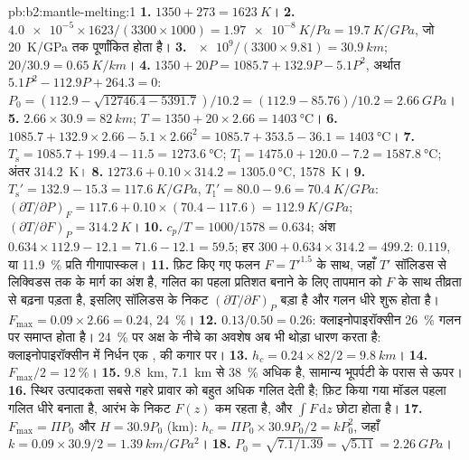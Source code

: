 \begin{solution}{pb:b2:mantle-melting:1}
\textbf{1.} $1350 + 273 = \qty{1623}{K}$।
\textbf{2.} $\num{4.0e-5}\times1623/(3300\times1000) = \qty{1.97e-8}{K/Pa} =
\qty{19.7}{K/GPa}$, जो \qty{20}{K/GPa} तक पूर्णांकित होता है।
\textbf{3.} $\num{e9}/(3300\times9.81) = \qty{30.9}{km}$; $20/30.9 =
\qty{0.65}{K/km}$।
\textbf{4.} $1350 + 20P = 1085.7 + 132.9P - 5.1P^2$, अर्थात $5.1P^2 - 112.9P +
264.3 = 0$: $P_0 = (112.9 - \sqrt{12746.4 - 5391.7})/10.2 = (112.9 - 85.76)/10.2 =
\qty{2.66}{GPa}$।
\textbf{5.} $2.66\times30.9 = \qty{82}{km}$; $T = 1350 + 20\times2.66 =
\qty{1403}{\celsius}$।
\textbf{6.} $1085.7 + 132.9\times2.66 - 5.1\times2.66^2 = 1085.7 + 353.5 - 36.1 =
\qty{1403}{\celsius}$।
\textbf{7.} $T_{\mathrm s} = 1085.7 + 199.4 - 11.5 = \qty{1273.6}{\celsius}$;
$T_{\mathrm l} = 1475.0 + 120.0 - 7.2 = \qty{1587.8}{\celsius}$; अंतर
\qty{314.2}{K}।
\textbf{8.} $1273.6 + 0.10\times314.2 = \qty{1305.0}{\celsius}$, \qty{1578}{K}।
\textbf{9.} $T_{\mathrm s}' = 132.9 - 15.3 = \qty{117.6}{K/GPa}$, $T_{\mathrm l}' =
80.0 - 9.6 = \qty{70.4}{K/GPa}$: $(\partial T/\partial P)_F = 117.6 +
0.10\times(70.4 - 117.6) = \qty{112.9}{K/GPa}$; $(\partial T/\partial F)_P =
\qty{314.2}{K}$।
\textbf{10.} $c_p/T = 1000/1578 = 0.634$; अंश $0.634\times112.9 - 12.1 = 71.6
- 12.1 = 59.5$; हर $300 + 0.634\times314.2 = 499.2$: $0.119$, या
\qty{11.9}{\percent} प्रति गीगापास्कल।
\textbf{11.} फ़िट किए गए फलन $F = T'^{1.5}$ के साथ, जहाँ $T'$ सॉलिडस से लिक्विडस तक के मार्ग का अंश है, गलित का पहला प्रतिशत बनाने के लिए
तापमान को $F$ के साथ तीव्रता से बढ़ना पड़ता है, इसलिए सॉलिडस के निकट $(\partial T/\partial F)_P$ बड़ा है
और गलन धीरे शुरू होता है। $F_{\max} = 0.09\times2.66 = 0.24$, \qty{24}{\percent}।
\textbf{12.} $0.13/0.50 = 0.26$: क्लाइनोपाइरॉक्सीन \qty{26}{\percent} गलन पर
समाप्त होता है। \qty{24}{\percent} पर अक्ष के नीचे का अवशेष अब भी थोड़ा धारण करता है:
क्लाइनोपाइरॉक्सीन में निर्धन एक ,  की कगार पर।
\textbf{13.} $h_c = 0.24\times82/2 = \qty{9.8}{km}$।
\textbf{14.} $F_{\max}/2 = \qty{12}{\percent}$।
\textbf{15.} \qty{9.8}{km}, \qty{7.1}{km} से \qty{38}{\percent} अधिक है,
सामान्य भूपर्पटी के परास से ऊपर।
\textbf{16.} स्थिर उत्पादकता सबसे गहरे प्रावार को बहुत अधिक गलित देती है;
फ़िट किया गया मॉडल पहला गलित धीरे बनाता है, आरंभ के निकट $F(z)$ कम रहता है, और
$\int F\,\mathrm dz$ छोटा होता है।
\textbf{17.} $F_{\max} = \Pi P_0$ और $H = 30.9P_0$ (km): $h_c = \Pi P_0\times30.9P_0/2
= kP_0^2$, जहाँ $k = 0.09\times30.9/2 = \qty{1.39}{km/GPa^2}$।
\textbf{18.} $P_0 = \sqrt{7.1/1.39} = \sqrt{5.11} = \qty{2.26}{GPa}$।

\end{solution}
